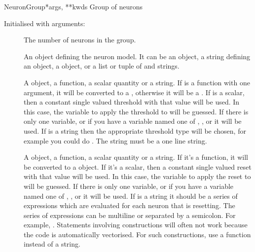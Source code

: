 \documentclass[letterpaper,10pt,english]{manual}
\begin{document}
\hypertarget{brian.NeuronGroup}{}\begin{classdesc}{NeuronGroup}{*args, **kwds}
Group of neurons

Initialised with arguments:
\begin{description}
\item[]
The number of neurons in the group.

\item[]
An object defining the neuron model. It can be
an \hyperlink{brian.Equations}{} object, a string defining an \hyperlink{brian.Equations}{} object,
a  object, or a list or tuple of \hyperlink{brian.Equations}{} and
strings.

\item[]
A \hyperlink{brian.Threshold}{} object, a function, a scalar quantity or a string.
If  is a function with one argument, it will be
converted to a \hyperlink{brian.SimpleFunThreshold}{}, otherwise it will be a
\hyperlink{brian.FunThreshold}{}. If  is a scalar, then a constant
single valued threshold with that value will be used. In this case,
the variable to apply the threshold to will be guessed. If there is
only one variable, or if you have a variable named one of
, ,  or  it will be used. If  is a
string then the appropriate threshold type will be chosen, for example
you could do . The string must be a one line
string.

\item[]
A \hyperlink{brian.Reset}{} object, a function, a scalar quantity or a string. If it's a
function, it will be converted to a \hyperlink{brian.FunReset}{} object. If it's
a scalar, then a constant single valued reset with that value will
be used. In this case,
the variable to apply the reset to will be guessed. If there is
only one variable, or if you have a variable named one of
, ,  or  it will be used. If  is a
string it should be a series of expressions which are evaluated for
each neuron that is resetting. The series of expressions can be
multiline or separated by a semicolon. For example,
. Statements involving  constructions
will often not work because the code is automatically vectorised.
For such constructions, use a function instead of a string.


\end{description}
\end{classdesc}
\end{document}
